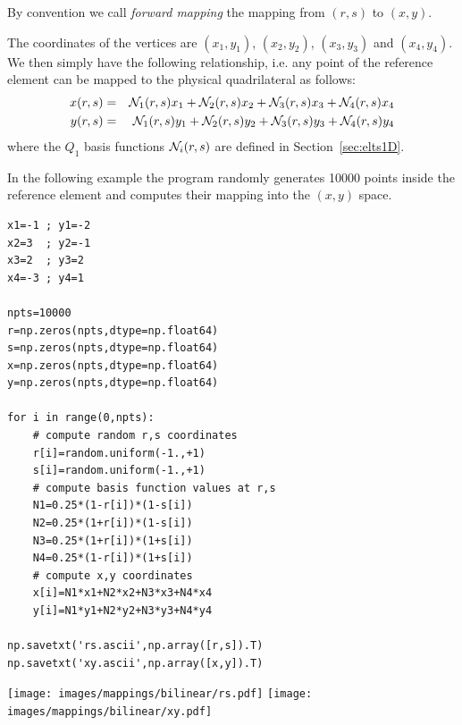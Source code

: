 By convention we call {\it forward mapping} the mapping from $(r,s)$
to $(x,y)$.

The coordinates of the vertices are 
$(x_1,y_1)$, $(x_2,y_2)$, $(x_3,y_3)$ and $(x_4,y_4)$.
We then simply have the 
following relationship, i.e. any point of the reference element 
can be mapped to the physical quadrilateral as follows:
\begin{eqnarray}
x(r,s)&=& {\mathcal{N}}_1(r,s) x_1 + {\mathcal{N}}_2(r,s) x_2 + {\mathcal{N}}_3(r,s) x_3 + {\mathcal{N}}_4(r,s) x_4 \nonumber\\
y(r,s)&=& {\mathcal{N}}_1(r,s) y_1 + {\mathcal{N}}_2(r,s) y_2 + {\mathcal{N}}_3(r,s) y_3 + {\mathcal{N}}_4(r,s) y_4 \label{mapppQ1a} 
\end{eqnarray} 
where the $Q_1$ basis functions ${\mathcal{N}}_i(r,s)$ are defined in Section~\ref{sec:elts1D}.

In the following example the program randomly generates 10000 points 
inside the reference 
element and computes their mapping into the $(x,y)$ space. 

\begin{lstlisting}
x1=-1 ; y1=-2
x2=3  ; y2=-1
x3=2  ; y3=2
x4=-3 ; y4=1

npts=10000
r=np.zeros(npts,dtype=np.float64)   
s=np.zeros(npts,dtype=np.float64)   
x=np.zeros(npts,dtype=np.float64)   
y=np.zeros(npts,dtype=np.float64)   

for i in range(0,npts):
    # compute random r,s coordinates
    r[i]=random.uniform(-1.,+1)
    s[i]=random.uniform(-1.,+1)
    # compute basis function values at r,s
    N1=0.25*(1-r[i])*(1-s[i])
    N2=0.25*(1+r[i])*(1-s[i])
    N3=0.25*(1+r[i])*(1+s[i])
    N4=0.25*(1-r[i])*(1+s[i])
    # compute x,y coordinates
    x[i]=N1*x1+N2*x2+N3*x3+N4*x4
    y[i]=N1*y1+N2*y2+N3*y3+N4*y4

np.savetxt('rs.ascii',np.array([r,s]).T)
np.savetxt('xy.ascii',np.array([x,y]).T)
\end{lstlisting}

\begin{center}
\texttt{[image: images/mappings/bilinear/rs.pdf]}
\texttt{[image: images/mappings/bilinear/xy.pdf]}
\end{center}

